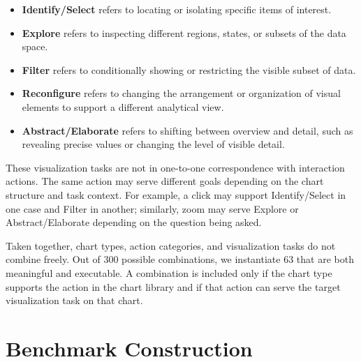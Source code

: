 \documentclass[review,journal,hideappendix]{vgtc} %
\newcommand{\placeholder}[1]{\textcolor{red}{\textbf{[Placeholder: #1]}}}
\begin{document}
\begin{itemize}[leftmargin=*]
    \item \textbf{Identify/Select} refers to locating or isolating specific items of interest.
    
    \item \textbf{Explore} refers to inspecting different regions, states, or subsets of the data space.

    \item \textbf{Filter} refers to conditionally showing or restricting the visible subset of data.

    \item \textbf{Reconfigure} refers to changing the arrangement or organization of visual elements to support a different analytical view.

    \item \textbf{Abstract/Elaborate} refers to shifting between overview and detail, such as revealing precise values or changing the level of visible detail.
\end{itemize}

These visualization tasks are not in one-to-one correspondence with interaction actions. The same action may serve different goals depending on the chart structure and task context. For example, a click may support Identify/Select in one case and Filter in another; similarly, zoom may serve Explore or Abstract/Elaborate depending on the question being asked.

Taken together, chart types, action categories, and visualization tasks do not combine freely.
Out of 300 possible combinations, we instantiate 63 that are both meaningful and executable. A combination is included only if the chart type supports the action in the chart library and if that action can serve the target visualization task on that chart.

\section{Benchmark Construction}
\end{document}
